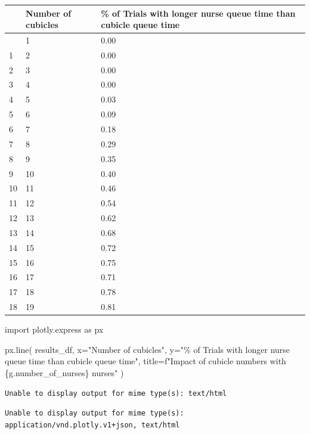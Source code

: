 \documentclass[
  letterpaper,
  DIV=11,
  numbers=noendperiod]{scrreprt}
\newenvironment{Shaded}{}{}
\newcommand{\ImportTok}[1]{\textcolor[rgb]{0.01,0.18,0.38}{#1}}
\newcommand{\NormalTok}[1]{\textcolor[rgb]{0.14,0.16,0.18}{#1}}
\newcommand{\OperatorTok}[1]{\textcolor[rgb]{0.14,0.16,0.18}{#1}}
\newcommand{\SpecialCharTok}[1]{\textcolor[rgb]{0.00,0.36,0.77}{#1}}
\newcommand{\SpecialStringTok}[1]{\textcolor[rgb]{0.01,0.18,0.38}{#1}}
\newcommand{\StringTok}[1]{\textcolor[rgb]{0.01,0.18,0.38}{#1}}
\begin{document}
\begin{longtable}[]{@{}lll@{}}
\toprule\noalign{}
& Number of cubicles & \% of Trials with longer nurse queue time than
cubicle queue time \\
\midrule\noalign{}
\endhead
\bottomrule\noalign{}
\endlastfoot
0 & 1 & 0.00 \\
1 & 2 & 0.00 \\
2 & 3 & 0.00 \\
3 & 4 & 0.00 \\
4 & 5 & 0.03 \\
5 & 6 & 0.09 \\
6 & 7 & 0.18 \\
7 & 8 & 0.29 \\
8 & 9 & 0.35 \\
9 & 10 & 0.40 \\
10 & 11 & 0.46 \\
11 & 12 & 0.54 \\
12 & 13 & 0.62 \\
13 & 14 & 0.68 \\
14 & 15 & 0.72 \\
15 & 16 & 0.75 \\
16 & 17 & 0.71 \\
17 & 18 & 0.78 \\
18 & 19 & 0.81 \\
\end{longtable}

\begin{Shaded}
\begin{Highlighting}[]
\ImportTok{import}\NormalTok{ plotly.express }\ImportTok{as}\NormalTok{ px}

\NormalTok{px.line(}
\NormalTok{  results\_df,}
\NormalTok{  x}\OperatorTok{=}\StringTok{"Number of cubicles"}\NormalTok{,}
\NormalTok{  y}\OperatorTok{=}\StringTok{"}\SpecialCharTok{\% o}\StringTok{f Trials with longer nurse queue time than cubicle queue time"}\NormalTok{,}
\NormalTok{  title}\OperatorTok{=}\SpecialStringTok{f"Impact of cubicle numbers with }\SpecialCharTok{\{}\NormalTok{g}\SpecialCharTok{.}\NormalTok{number\_of\_nurses}\SpecialCharTok{\}}\SpecialStringTok{ nurses"}
\NormalTok{  )}
\end{Highlighting}
\end{Shaded}

\begin{verbatim}
Unable to display output for mime type(s): text/html
\end{verbatim}

\begin{verbatim}
Unable to display output for mime type(s): application/vnd.plotly.v1+json, text/html
\end{verbatim}
\end{document}
